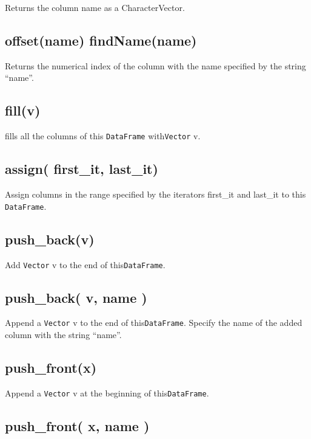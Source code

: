 \documentclass[]{book}
\theoremstyle{definition}
\theoremstyle{definition}
\theoremstyle{remark}
\begin{document}
Returns the column name as a CharacterVector.

\subsection{offset(name) findName(name)}\label{offsetname-findnamename}

Returns the numerical index of the column with the name specified by the
string ``name''.

\subsection{fill(v)}\label{fillv}

fills all the columns of this \texttt{DataFrame} with\texttt{Vector} v.

\subsection{assign( first\_it,
last\_it)}\label{assign-first_it-last_it-1}

Assign columns in the range specified by the iterators first\_it and
last\_it to this \texttt{DataFrame}.

\subsection{push\_back(v)}\label{push_backv}

Add \texttt{Vector} v to the end of this\texttt{DataFrame}.

\subsection{push\_back( v, name )}\label{push_back-v-name}

Append a \texttt{Vector} v to the end of this\texttt{DataFrame}. Specify
the name of the added column with the string ``name''.

\subsection{push\_front(x)}\label{push_frontx}

Append a \texttt{Vector} v at the beginning of this\texttt{DataFrame}.

\subsection{push\_front( x, name )}\label{push_front-x-name-1}
\end{document}
